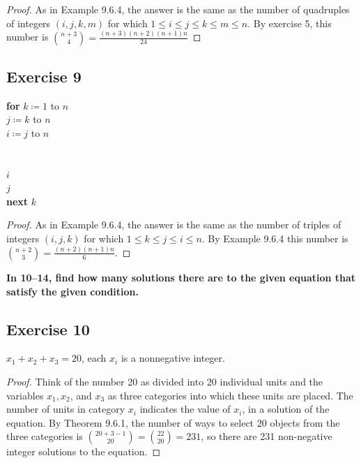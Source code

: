 \documentclass[14pt]{extarticle}
\newcommand{\cy}{\color{cyan}}
\begin{document}
\begin{proof}
As in Example 9.6.4, the answer is the same as the number of quadruples of integers \((i, j, k, m)\) for which \(1 \leq i 
\leq j \leq k \leq m \leq n\). By exercise 5, this number is \(\binom{n+3}{4} = \frac{(n+3)(n+2)(n+1)n}{24}\)
\end{proof}

\subsection{Exercise 9}
\begin{tabbing}
{\bf for} \=\(k \coloneqq 1\) to \(n\) \\
           \=\(j\coloneqq k\) to \(n\) \\
          \>          \=\(i \coloneqq j\) to \(n\) \\
          \>         \>          \>{\it [Statements in the body of the inner loop, none} \\
          \>         \>          \>{\it containing branching statements that lead outside the loop]} \\
          \>          \(i\) \\
           \(j\) \\
{\bf next} \(k\)
\end{tabbing}

\begin{proof}
As in Example 9.6.4, the answer is the same as the number of triples of integers \((i, j, k)\) for which \(1 \leq k \leq j 
\leq i \leq n\). By Example 9.6.4 this number is \(\binom{n+2}{3} = \frac{(n+2)(n+1)n}{6}\).
\end{proof}

{\bf \cy In 10–14, find how many solutions there are to the given equation that satisfy the given condition.}

\subsection{Exercise 10}
\(x_1 + x_2 + x_3 = 20\), each \(x_i\) is a nonnegative integer.

\begin{proof}
Think of the number 20 as divided into 20 individual units and the variables \(x_1, x_2\), and \(x_3\) as three categories 
into which these units are placed. The number of units in category \(x_i\) indicates the value of \(x_i\), in a solution 
of the equation. By Theorem 9.6.1, the number of ways to select 20 objects from the three categories is 
\(\binom{20+3-1}{20} = \binom{22}{20} = 231\), so there are 231 non-negative integer solutions to the equation.
\end{proof}
\end{document}
